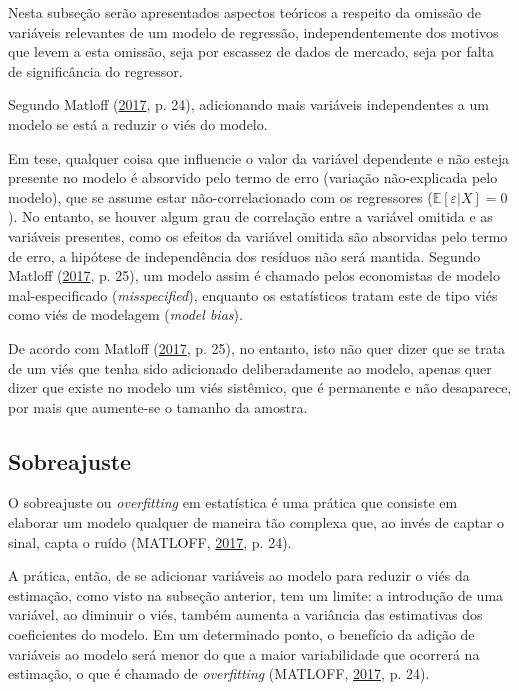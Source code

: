 \documentclass[
  a4paper, 11pt]{article}
\begin{document}
Nesta subseção serão apresentados aspectos teóricos a respeito da
omissão de variáveis relevantes de um modelo de regressão,
independentemente dos motivos que levem a esta omissão, seja por
escassez de dados de mercado, seja por falta de significância do
regressor.

Segundo Matloff (\protect\hyperlink{ref-matloff2017}{2017}, p. 24),
adicionando mais variáveis independentes a um modelo se está a reduzir o
viés do modelo.

Em tese, qualquer coisa que influencie o valor da variável dependente e
não esteja presente no modelo é absorvido pelo termo de erro (variação
não-explicada pelo modelo), que se assume estar não-correlacionado com
os regressores (\(\mathbb{E}[\varepsilon|X] = 0\)). No entanto, se
houver algum grau de correlação entre a variável omitida e as variáveis
presentes, como os efeitos da variável omitida são absorvidas pelo termo
de erro, a hipótese de independência dos resíduos não será mantida.
Segundo Matloff (\protect\hyperlink{ref-matloff2017}{2017}, p. 25), um
modelo assim é chamado pelos economistas de modelo mal-especificado
(\emph{misspecified}), enquanto os estatísticos tratam este de tipo viés
como viés de modelagem (\emph{model bias}).

De acordo com Matloff (\protect\hyperlink{ref-matloff2017}{2017}, p.
25), no entanto, isto não quer dizer que se trata de um viés que tenha
sido adicionado deliberadamente ao modelo, apenas quer dizer que existe
no modelo um viés sistêmico, que é permanente e não desaparece, por mais
que aumente-se o tamanho da amostra.

\hypertarget{sobreajuste}{%
\subsection{Sobreajuste}\label{sobreajuste}}

O sobreajuste ou \emph{overfitting} em estatística é uma prática que
consiste em elaborar um modelo qualquer de maneira tão complexa que, ao
invés de captar o sinal, capta o ruído (MATLOFF,
\protect\hyperlink{ref-matloff2017}{2017}, p. 24).

A prática, então, de se adicionar variáveis ao modelo para reduzir o
viés da estimação, como visto na subseção anterior, tem um limite: a
introdução de uma variável, ao diminuir o viés, também aumenta a
variância das estimativas dos coeficientes do modelo. Em um determinado
ponto, o benefício da adição de variáveis ao modelo será menor do que a
maior variabilidade que ocorrerá na estimação, o que é chamado de
\emph{overfitting} (MATLOFF, \protect\hyperlink{ref-matloff2017}{2017},
p. 24).
\end{document}
